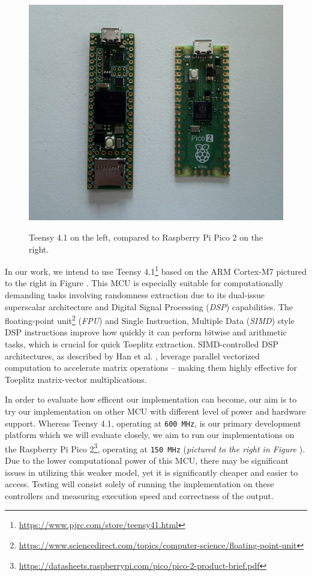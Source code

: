 \begin{figure}
\centering
\includegraphics[width=1\linewidth,height=\textheight,keepaspectratio,alt={Teensy 4.1 on the left, compared to Raspberry Pi Pico 2 on the right.}]{img/mcu.jpeg}
\caption{Teensy 4.1 on the left, compared to Raspberry Pi Pico 2 on the right.}\label{fig:mcu}
\end{figure}

In our work, we intend to use Teensy 4.1\footnote{\url{https://www.pjrc.com/store/teensy41.html}} based on the ARM Cortex-M7 pictured to the right in Figure \cite{fig:mcu}. This MCU is especially suitable for computationally demanding tasks involving randomness extraction due to its dual-issue superscalar architecture and Digital Signal Processing (\emph{DSP}) capabilities. The floating-point unit\footnote{\url{https://www.sciencedirect.com/topics/computer-science/floating-point-unit}} (\emph{FPU}) and Single Instruction, Multiple Data (\emph{SIMD}) style DSP instructions improve how quickly it can perform bitwise and arithmetic tasks, which is crucial for quick Toeplitz extraction. SIMD-controlled DSP architectures, as described by Han et al. \cite{simd-dsp}, leverage parallel vectorized computation to accelerate matrix operations -- making them highly effective for Toeplitz matrix-vector multiplications.

In order to evaluate how efficent our implementation can become, our aim is to try our implementation on other MCU with different level of power and hardware support. Whereas Teensy 4.1, operating at \texttt{600\ MHz}, is our primary development platform which we will evaluate closely, we aim to run our implementations on the Raspberry Pi Pico 2\footnote{\url{https://datasheets.raspberrypi.com/pico/pico-2-product-brief.pdf}}, operating at \texttt{150\ MHz} (\emph{pictured to the right in Figure \cite{fig:mcu}}). Due to the lower computational power of this MCU, there may be significant issues in utilizing this weaker model, yet it is significantly cheaper and easier to access. Testing will consist solely of running the implementation on these controllers and measuring execution speed and correctness of the output.

